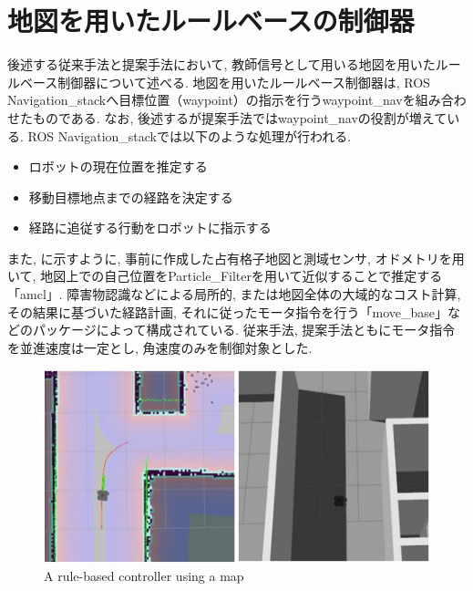 
\section{地図を用いたルールベースの制御器}
後述する従来手法と提案手法において, 教師信号として用いる地図を用いたルールベース制御器について述べる. 地図を用いたルールベース制御器は, ROS Navigation\_stack\cite{navigation:online}へ目標位置（waypoint）の指示を行うwaypoint\_nav\cite{waypoint_nav:online}を組み合わせたものである. なお, 後述するが提案手法ではwaypoint\_navの役割が増えている. ROS Navigation\_stackでは以下のような処理が行われる. 

\begin{itemize}
  \item ロボットの現在位置を推定する
  \item 移動目標地点までの経路を決定する
  \item 経路に追従する行動をロボットに指示する
\end{itemize}

また, に示すように, 事前に作成した占有格子地図と測域センサ, オドメトリを用いて, 地図上での自己位置をParticle\_Filterを用いて近似することで推定する「amcl」. 障害物認識などによる局所的, または地図全体の大域的なコスト計算, その結果に基づいた経路計画, それに従ったモータ指令を行う「move\_base」などのパッケージによって構成されている. 従来手法, 提案手法ともにモータ指令を並進速度は一定とし, 角速度のみを制御対象とした.


\begin{figure}[hbtp]
  \centering
 \includegraphics[keepaspectratio, scale=0.6]
      {images/rule-based.png}
 \caption{A rule-based controller using a map}
 \label{Fig:navigation}
\end{figure}

\newpage